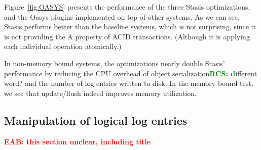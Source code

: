 \documentclass[letterpaper,twocolumn,10pt]{article}
\newcommand{\yad}{Stasis\xspace}
\newcommand{\yads}{Stasis'\xspace}
\newcommand{\oasys}{Oasys\xspace}
\newcommand{\eab}[1]{\textcolor{red}{\bf EAB: #1}}
\newcommand{\rcs}[1]{\textcolor{green}{\bf RCS: #1}}
\begin{document}
Figure~\ref{fig:OASYS} presents the performance of the three
\yad optimizations, and the \oasys plugins implemented on top of other
systems.  As we can see, \yad performs better than the baseline
systems, which is not surprising, since it is not providing the A
property of ACID transactions.  (Although it is applying each individual operation atomically.)

In non-memory bound systems, the optimizations nearly double \yads
performance by reducing the CPU overhead of object serialization{\rcs different word?} and
the number of log entries written to disk.  In the memory bound test,
we see that update/flush indeed improves memory utilization.


\subsection{Manipulation of logical log entries}

\eab{this section unclear, including title}
\end{document}
